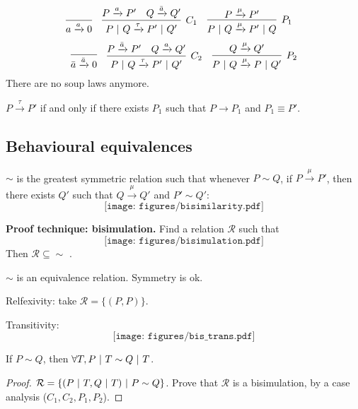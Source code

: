 	$$
		\infer{a \xrightarrow a 0}{}\quad
		\infer[C_1]{P \parc Q \xrightarrow \tau P' \parc Q'}{P \xrightarrow a P' & Q \xrightarrow {\bar a} Q'}\quad
		\infer[P_1]{P\parc Q \xrightarrow \mu P'\parc Q}{P\xrightarrow \mu P'}\quad
	$$
	$$
	\infer{\bar a \xrightarrow {\bar a} 0}{}\quad
	\infer[C_2]{P \parc Q \xrightarrow \tau P' \parc Q'}{P \xrightarrow {\bar a} P' & Q \xrightarrow a Q'}	\quad{}
	\infer[P_2]{P\parc Q \xrightarrow \mu P\parc Q'}{Q\xrightarrow \mu Q'}
	$$
	There are no soup laws anymore.
	
	\begin{lemma}\label{lem:harmony}
		$P\xrightarrow \tau P'$ if and only if there exists $P_1$ such that $P\rightarrow P_1$ and $P_1 \equiv P'$.
	\end{lemma}
	
	
\subsection{Behavioural equivalences}

\begin{definition}
	$\sim$ is the greatest symmetric relation such that whenever $P \sim Q$, if $P \xrightarrow \mu P'$, then there exists $Q'$ such that $Q\xrightarrow \mu Q'$ and $P' \sim Q'$: $$\texttt{[image: figures/bisimilarity.pdf]}$$
\end{definition}

	\textbf{Proof technique: bisimulation.} Find a relation $\mathcal R$ such that $$\texttt{[image: figures/bisimulation.pdf]}$$ Then $\mathcal R \subseteq \sim$ .

	\begin{prop}
		$\sim$ is an equivalence relation.
		Symmetry is ok.
		
		Relfexivity: take ${\mathcal R} = \{(P, P)\}$.
		
		Transitivity: $$\texttt{[image: figures/bis\_trans.pdf]}$$
	\end{prop}
	
	\begin{lemma}[Congruence]
		If $P\sim Q$, then $\forall T, P \ |\  T \sim Q\ |\  T$.
	\end{lemma}
	\begin{proof}%
		${\mathcal R} = \{(P \ |\  T, Q \ |\  T) \ |\  P\sim Q\}$. Prove that $\mathcal R$ is a bisimulation, by a case analysis ($C_1, C_2, P_1, P_2$).
	\end{proof}
	

